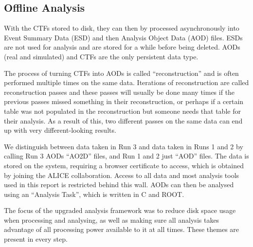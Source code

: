 \subsection{Offline Analysis}
With the CTFs stored to disk, they can then by processed asynchronously into Event Summary Data (ESD) and then Analysis Object Data (AOD) files. ESDs are not used for analysis and are stored for a while before being deleted. AODs (real and simulated) and CTFs are the only persistent data type. 

The process of turning CTFs into AODs is called ``reconstruction'' and is often performed multiple times on the same data. Iterations of reconstruction are called reconstruction passes and these passes will usually be done many times if the previous passes missed something in their reconstruction, or perhaps if a certain table was not populated in the reconstruction but someone needs that table for their analysis. As a result of this, two different passes on the same data can end up with very different-looking results. 

We distinguish between data taken in Run 3 and data taken in Runs 1 and 2 by calling Run 3 AODs ``AO2D'' files, and Run 1 and 2 just ``AOD'' files. The data is stored on the  system, requiring a browser certificate to access, which is obtained by joining the ALICE collaboration. Access to all data and most analysis tools used in this report is restricted behind this wall. AODs can then be analysed using an ``Analysis Task'', which is written in C\OldTexttt{++} and ROOT. 

The focus of the upgraded analysis framework was to reduce disk space usage when processing and analysing, as well as making sure all analysis takes advantage of all processing power available to it at all times. These themes are present in every step.